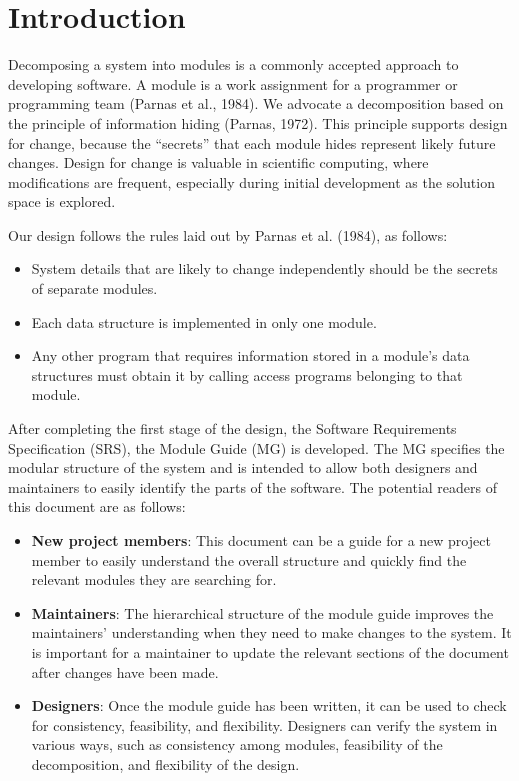 \documentclass[12pt, titlepage]{article}
\begin{document}
\newpage

\tableofcontents

\listoftables

\listoffigures

\newpage


\section{Introduction}
\label{SecIntro}

Decomposing a system into modules is a commonly accepted approach to developing
software. A module is a work assignment for a programmer or programming
team (Parnas et al., 1984). We advocate a decomposition
based on the principle of information hiding (Parnas, 1972). This
principle supports design for change, because the ``secrets'' that each module
hides represent likely future changes. Design for change is valuable in scientific computing,
where modifications are frequent, especially during initial development as the
solution space is explored.  

Our design follows the rules laid out by Parnas et al. (1984), as follows:
\begin{itemize}
  \item System details that are likely to change independently should be the
  secrets of separate modules.
  \item Each data structure is implemented in only one module.
  \item Any other program that requires information stored in a module's data
  structures must obtain it by calling access programs belonging to that module.
\end{itemize}

After completing the first stage of the design, the Software Requirements
Specification (SRS), the Module Guide (MG) is developed. The MG
specifies the modular structure of the system and is intended to allow both
designers and maintainers to easily identify the parts of the software. The
potential readers of this document are as follows:

\begin{itemize}
  \item \textbf{New project members}: This document can be a guide for a new project member
  to easily understand the overall structure and quickly find the
  relevant modules they are searching for.
  \item \textbf{Maintainers}: The hierarchical structure of the module guide improves the
  maintainers' understanding when they need to make changes to the system. It is
  important for a maintainer to update the relevant sections of the document
  after changes have been made.
  \item \textbf{Designers}: Once the module guide has been written, it can be used to
  check for consistency, feasibility, and flexibility. Designers can verify the
  system in various ways, such as consistency among modules, feasibility of the
  decomposition, and flexibility of the design.
\end{itemize}
\end{document}
